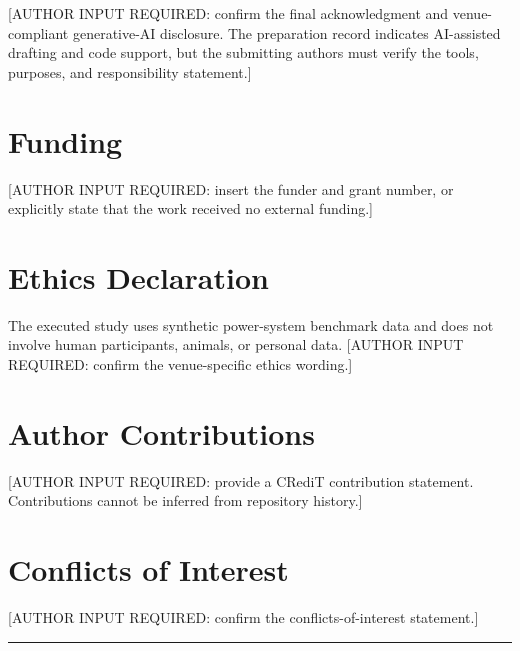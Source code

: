 \documentclass{ieeeaccess}
\begin{document}
{[}AUTHOR INPUT REQUIRED: confirm the final acknowledgment and venue-compliant generative-AI disclosure. The preparation record indicates AI-assisted drafting and code support, but the submitting authors must verify the tools, purposes, and responsibility statement.{]}

\section*{Funding}

{[}AUTHOR INPUT REQUIRED: insert the funder and grant number, or explicitly state that the work received no external funding.{]}

\section{Ethics Declaration}\label{ethics-declaration}

The executed study uses synthetic power-system benchmark data and does not involve human participants, animals, or personal data. {[}AUTHOR INPUT REQUIRED: confirm the venue-specific ethics wording.{]}

\section*{Author Contributions}

{[}AUTHOR INPUT REQUIRED: provide a CRediT contribution statement. Contributions cannot be inferred from repository history.{]}

\section*{Conflicts of Interest}

{[}AUTHOR INPUT REQUIRED: confirm the conflicts-of-interest statement.{]}

\begin{center}\rule{0.5\linewidth}{0.5pt}\end{center}
\end{document}
